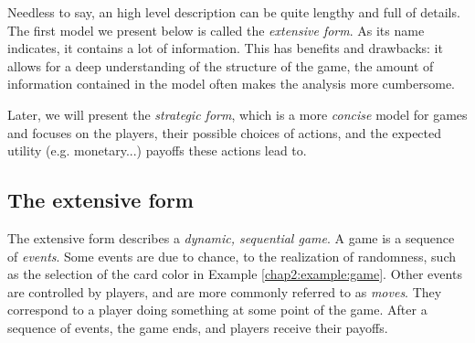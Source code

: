 Needless to say, an high level description can be quite lengthy and full of details.
The first model we present below is called the \emph{extensive form}. As its name indicates, it contains a lot of information. This has benefits and drawbacks: it allows for a deep understanding of
 the structure of the game, 
 the amount of information 
 contained in the model
 often makes the analysis more cumbersome.  
 
 Later, we will present the   \emph{strategic form}, which is a more \emph{concise} model for games and focuses on the players,  their possible choices of actions, and the expected utility (e.g. monetary...) payoffs  these actions lead to.  


\subsection{The extensive form}
\label{subsec:ExtForm}
The extensive form describes a \emph{dynamic, sequential game}. 
A game is a sequence of \emph{events}. 
Some events are due to chance, 
to the realization of randomness, 
such as the selection of the card color in Example 
\ref{chap2:example:game}.
Other events are controlled by players, 
and are more commonly referred to as \emph{moves}.
They correspond to a player doing something at some point
 of the game.
After a sequence of events, the game ends,
 and players receive their payoffs.

